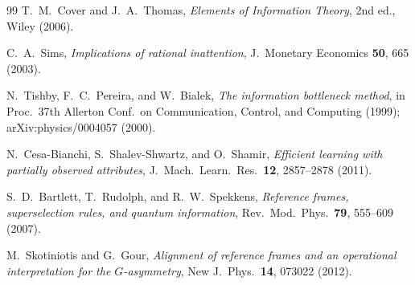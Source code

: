 \documentclass[12pt]{article}
\theoremstyle{definition}
\begin{document}
\begin{thebibliography}{99}
T.~M.~Cover and J.~A.~Thomas,
\emph{Elements of Information Theory},
2nd ed., Wiley (2006).

C.~A.~Sims,
\emph{Implications of rational inattention},
J.\ Monetary Economics \textbf{50}, 665 (2003).

N.~Tishby, F.~C.~Pereira, and W.~Bialek,
\emph{The information bottleneck method},
in Proc.\ 37th Allerton Conf.\ on Communication, Control, and Computing (1999); arXiv:physics/0004057 (2000).

N.~Cesa-Bianchi, S.~Shalev-Shwartz, and O.~Shamir,
\emph{Efficient learning with partially observed attributes},
J.\ Mach.\ Learn.\ Res.\ \textbf{12}, 2857--2878 (2011).

S.~D.~Bartlett, T.~Rudolph, and R.~W.~Spekkens,
\emph{Reference frames, superselection rules, and quantum information},
Rev.\ Mod.\ Phys.\ \textbf{79}, 555--609 (2007).

M.~Skotiniotis and G.~Gour,
\emph{Alignment of reference frames and an operational interpretation for the $G$-asymmetry},
New J.\ Phys.\ \textbf{14}, 073022 (2012).

\end{thebibliography}
\end{document}
